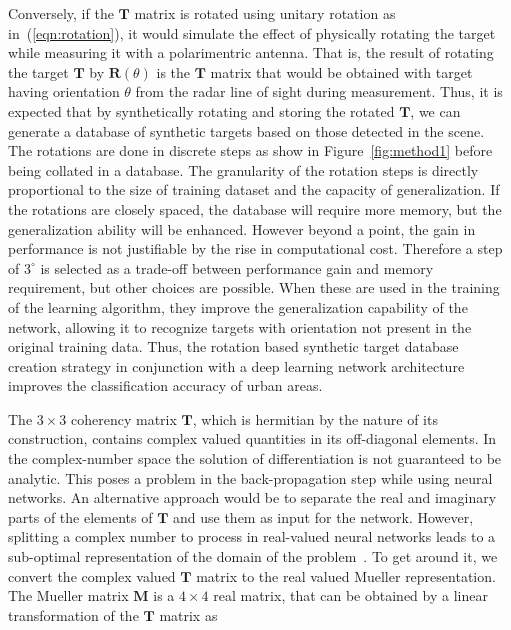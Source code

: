 Conversely, if the $\mathbf{T}$ matrix is rotated using unitary rotation as in~(\ref{eqn:rotation}), it would simulate the effect of physically rotating the target while measuring it with a polarimentric antenna. That is, the result of rotating the target $\mathbf{T}$ by $\mathbf{R}(\theta)$ is the $\mathbf{T}$ matrix that would be obtained with target having orientation $\theta$ from the radar line of sight during measurement. Thus, it is expected that by synthetically rotating and storing the rotated $\mathbf{T}$, we can generate a database of synthetic targets based on those detected in the scene.  The rotations are done in discrete steps as show in Figure~\ref{fig:method1} before being collated in a database. The granularity of the rotation steps is directly proportional to the size of training dataset and the capacity of generalization. If the rotations are closely spaced, the database will require more memory, but the generalization ability will be enhanced. However beyond a point, the gain in performance is not justifiable by the rise in computational cost. Therefore a step of $3^\circ$ is selected as a trade-off between performance gain and memory requirement, but other choices are possible. When these are used in the training of the learning algorithm, they improve the generalization capability of the network, allowing it to recognize targets with orientation not present in the original training data. Thus, the rotation based synthetic target database creation strategy in conjunction with a deep learning network architecture improves the classification accuracy of urban areas.

The $3\times3$ coherency matrix $\mathbf{T}$, which is hermitian by the nature of its construction, contains complex valued quantities in its off-diagonal elements. In the complex-number space the solution of differentiation is not guaranteed to be analytic. This poses a problem in the back-propagation step while using neural networks. An alternative approach would be to separate the real and imaginary parts of the elements of  $\mathbf{T}$ and use them as input for the network. However, splitting a complex number to process in real-valued neural networks leads to a sub-optimal representation of the domain of the problem~\cite{hirose2006complex}.
To get around it, we convert the complex valued $\mathbf{T}$ matrix to the real valued Mueller representation. 
The Mueller matrix $\mathbf{M}$ is a $4\times4$ real matrix, that can be obtained by a linear transformation of the $\mathbf{T}$ matrix as



